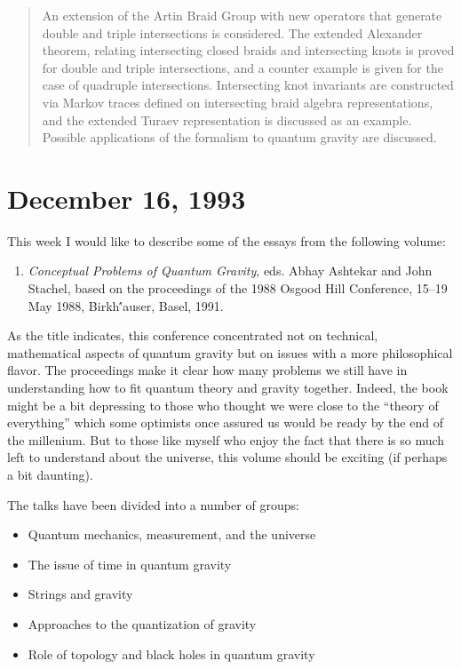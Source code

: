 \documentclass{article}
\def\tightlist{}
\begin{document}
\begin{quote}
An extension of the Artin Braid Group with new operators that generate
double and triple intersections is considered. The extended Alexander
theorem, relating intersecting closed braids and intersecting knots is
proved for double and triple intersections, and a counter example is
given for the case of quadruple intersections. Intersecting knot
invariants are constructed via Markov traces defined on intersecting
braid algebra representations, and the extended Turaev representation is
discussed as an example. Possible applications of the formalism to
quantum gravity are discussed.
\end{quote}



\hypertarget{week27}{%
\section{December 16, 1993}\label{week27}}

This week I would like to describe some of the essays from the following
volume:

\begin{enumerate}
\def\labelenumi{\arabic{enumi})}
\tightlist
\item
  \emph{Conceptual Problems of Quantum Gravity}, eds. 
   Abhay Ashtekar and John Stachel, based on the proceedings of the 1988 Osgood
  Hill Conference, 15--19 May 1988, Birkh\''auser, Basel, 1991.
\end{enumerate}
\noindent
As the title indicates, this conference concentrated not on technical,
mathematical aspects of quantum gravity but on issues with a more
philosophical flavor. The proceedings make it clear how many problems we
still have in understanding how to fit quantum theory and gravity
together. Indeed, the book might be a bit depressing to those who
thought we were close to the ``theory of everything'' which some
optimists once assured us would be ready by the end of the millenium.
But to those like myself who enjoy the fact that there is so much left
to understand about the universe, this volume should be exciting (if
perhaps a bit daunting).

The talks have been divided into a number of groups:

\begin{itemize}
\tightlist
\item
  Quantum mechanics, measurement, and the universe
\item
  The issue of time in quantum gravity
\item
  Strings and gravity
\item
  Approaches to the quantization of gravity
\item
  Role of topology and black holes in quantum gravity
\end{itemize}
\end{document}
